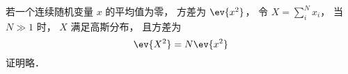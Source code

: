 
\begin{issues}
\issueDraft
\end{issues}


若一个连续随机变量 $x$ 的平均值为零， 方差为 $\ev{x^2}$， 令 $X = \sum_i^N x_i$， 当 $N \gg 1$ 时， $X$ 满足高斯分布， 且方差为
\begin{equation}
\ev{X^2} = N\ev{x^2}
\end{equation}
证明略．